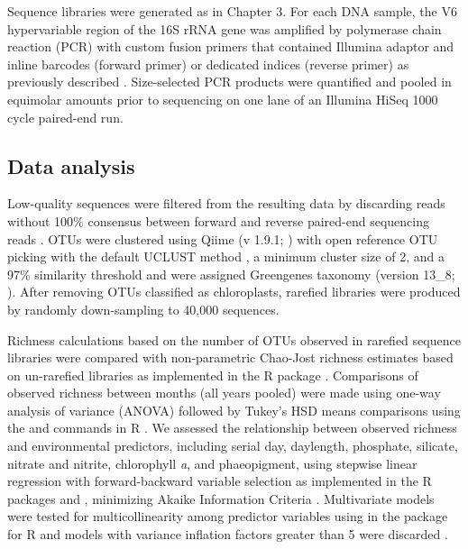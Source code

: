 Sequence libraries were generated as in Chapter 3. For each DNA sample, the V6 hypervariable region of the 16S rRNA gene was amplified by polymerase chain reaction (PCR) with custom fusion primers that contained Illumina adaptor and inline barcodes (forward primer) or dedicated indices (reverse primer) as previously described \citep{Eren2013-ob}. Size-selected PCR products were quantified and pooled in equimolar amounts prior to sequencing on one lane of an Illumina HiSeq 1000 cycle paired-end run. 

\subsection{Data analysis}

Low-quality sequences were filtered from the resulting data by discarding reads without 100\% consensus between forward and reverse paired-end sequencing reads \citep{Eren2013-ob}. OTUs were clustered using Qiime (v 1.9.1; \citealt{Caporaso2010-ee}) with open reference OTU picking with the default UCLUST method \citep{Edgar2010-gq}, a minimum cluster size of 2, and a 97\% similarity threshold and were assigned Greengenes taxonomy (version 13\_8; \citealt{McDonald2012-qf}). After removing OTUs classified as chloroplasts, rarefied libraries were produced by randomly down-sampling to 40,000 sequences.

Richness calculations based on the number of OTUs observed in rarefied sequence libraries were compared with non-parametric Chao-Jost richness estimates based on un-rarefied libraries as implemented in the R package  \citep{Chao2012-nw, chao2014rarefaction}. Comparisons of observed richness between months (all years pooled) were made using one-way analysis of variance (ANOVA) followed by Tukey's HSD means comparisons using the  and  commands in R \citep{t08}. We assessed the relationship between observed richness and environmental predictors, including serial day, daylength, phosphate, silicate, nitrate and nitrite, chlorophyll \emph{a}, and phaeopigment, using stepwise linear regression with forward-backward variable selection as implemented in the R packages  and , minimizing Akaike Information Criteria \citep{venables2002modern,zeileis2016dynlm}. Multivariate models were tested for multicollinearity among predictor variables using  in the  package for R and models with variance inflation factors greater than 5 were discarded \citep{fox2011car}. 

